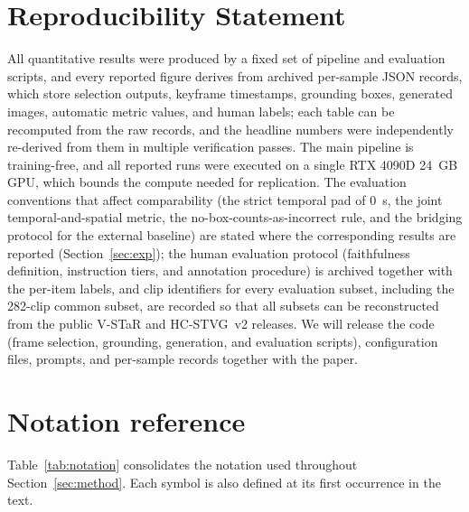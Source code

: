 \documentclass[10pt]{article}
\begin{document}
\section*{Reproducibility Statement}

All quantitative results were produced by a fixed set of pipeline and evaluation scripts, and every reported figure derives from archived per-sample JSON records, which store selection outputs, keyframe timestamps, grounding boxes, generated images, automatic metric values, and human labels; each table can be recomputed from the raw records, and the headline numbers were independently re-derived from them in multiple verification passes. The main pipeline is training-free, and all reported runs were executed on a single RTX 4090D 24~GB GPU, which bounds the compute needed for replication. The evaluation conventions that affect comparability (the strict temporal pad of 0~s, the joint temporal-and-spatial metric, the no-box-counts-as-incorrect rule, and the bridging protocol for the external baseline) are stated where the corresponding results are reported (Section~\ref{sec:exp}); the human evaluation protocol (faithfulness definition, instruction tiers, and annotation procedure) is archived together with the per-item labels, and clip identifiers for every evaluation subset, including the 282-clip common subset, are recorded so that all subsets can be reconstructed from the public V-STaR and HC-STVG~v2 releases. We will release the code (frame selection, grounding, generation, and evaluation scripts), configuration files, prompts, and per-sample records together with the paper.





\appendix

\section{Notation reference}\label{app:notation}

Table~\ref{tab:notation} consolidates the notation used throughout Section~\ref{sec:method}. Each symbol is also defined at its first occurrence in the text.
\end{document}
